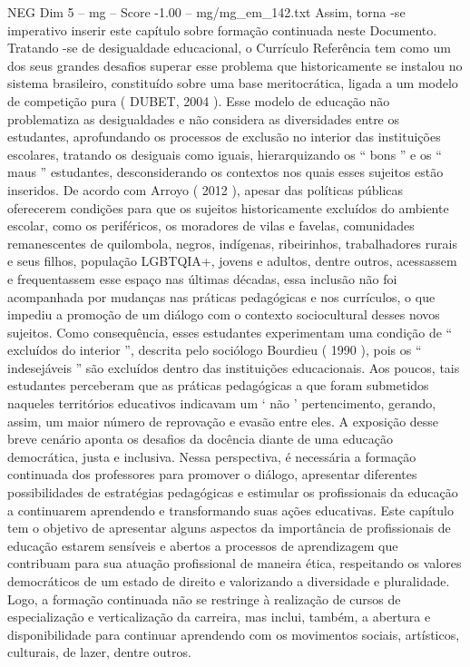 \begin{textsample}{NEG Dim 5 – mg – Score -1.00 – mg/mg\_em\_142.txt}
Assim, torna -se imperativo inserir este capítulo sobre formação continuada neste Documento.
Tratando -se de desigualdade educacional, o Currículo Referência tem como um dos seus grandes desafios superar esse problema que historicamente se instalou no sistema brasileiro, constituído sobre uma base meritocrática, ligada a um modelo de competição pura ( DUBET, 2004 ).
Esse modelo de educação não problematiza as desigualdades e não considera as diversidades entre os estudantes, aprofundando os processos de exclusão no interior das instituições escolares, tratando os desiguais como iguais, hierarquizando os “ bons ” e os “ maus ” estudantes, desconsiderando os contextos nos quais esses sujeitos estão inseridos.
De acordo com Arroyo ( 2012 ), apesar das políticas públicas oferecerem condições para que os sujeitos historicamente excluídos do ambiente escolar, como os periféricos, os moradores de vilas e favelas, comunidades remanescentes de quilombola, negros, indígenas, ribeirinhos, trabalhadores rurais e seus filhos, população LGBTQIA+, jovens e adultos, dentre outros, acessassem e frequentassem esse espaço nas últimas décadas, essa inclusão não foi acompanhada por mudanças nas práticas pedagógicas e nos currículos, o que impediu a promoção de um diálogo com o contexto sociocultural desses novos sujeitos.
Como consequência, esses estudantes experimentam uma condição de “ excluídos do interior ”, descrita pelo sociólogo Bourdieu ( 1990 ), pois os “ indesejáveis ” são excluídos dentro das instituições educacionais.
Aos poucos, tais estudantes perceberam que as práticas pedagógicas a que foram submetidos naqueles territórios educativos indicavam um ‘ não ’ pertencimento, gerando, assim, um maior número de reprovação e evasão entre eles.
A exposição desse breve cenário aponta os desafios da docência diante de uma educação democrática, justa e inclusiva.
Nessa perspectiva, é necessária a formação continuada dos professores para promover o diálogo, apresentar diferentes possibilidades de estratégias pedagógicas e estimular os profissionais da educação a continuarem aprendendo e transformando suas ações educativas.
Este capítulo tem o objetivo de apresentar alguns aspectos da importância de profissionais de educação estarem sensíveis e abertos a processos de aprendizagem que contribuam para sua atuação profissional de maneira ética, respeitando os valores democráticos de um estado de direito e valorizando a diversidade e pluralidade.
Logo, a formação continuada não se restringe à realização de cursos de especialização e verticalização da carreira, mas inclui, também, a abertura e disponibilidade para continuar aprendendo com os movimentos sociais, artísticos, culturais, de lazer, dentre outros.

\end{textsample}
